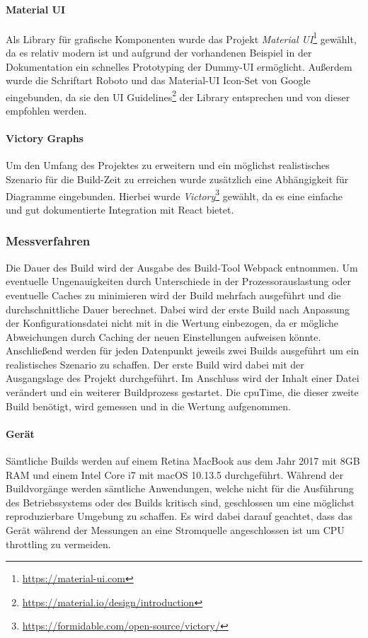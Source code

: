\documentclass[11pt]{article}
\begin{document}
				\paragraph{Material UI} Als Library für grafische Komponenten wurde das Projekt \emph{Material UI}\footnote{\url{https://material-ui.com}} gewählt, da es relativ modern ist und aufgrund der vorhandenen Beispiel in der Dokumentation ein schnelles Prototyping der Dummy-UI ermöglicht. Außerdem wurde die Schriftart Roboto und das Material-UI Icon-Set von Google eingebunden, da sie den UI Guidelines\footnote{\url{https://material.io/design/introduction}} der Library entsprechen und von dieser empfohlen werden.
				
				\paragraph{Victory Graphs} Um den Umfang des Projektes zu erweitern und ein möglichst realistisches Szenario für die Build-Zeit zu erreichen wurde zusätzlich eine Abhängigkeit für Diagramme eingebunden. Hierbei wurde \emph{Victory}\footnote{\url{https://formidable.com/open-source/victory/}} gewählt, da es eine einfache und gut dokumentierte Integration mit React bietet.
				
			\subsubsection{Messverfahren}
				Die Dauer des Build wird der Ausgabe des Build-Tool Webpack entnommen. Um eventuelle Ungenauigkeiten durch Unterschiede in der Prozessorauslastung oder eventuelle Caches zu minimieren wird der Build mehrfach ausgeführt und die durchschnittliche Dauer berechnet. Dabei wird der erste Build nach Anpassung der Konfigurationsdatei nicht mit in die Wertung einbezogen, da er mögliche Abweichungen durch Caching der neuen Einstellungen aufweisen könnte. Anschließend werden für jeden Datenpunkt jeweils zwei Builds ausgeführt um ein realistisches Szenario zu schaffen. Der erste Build wird dabei mit der Ausgangslage des Projekt durchgeführt. Im Anschluss wird der Inhalt einer Datei verändert und ein weiterer Buildprozess gestartet. Die \Gls{cpuTime}, die dieser zweite Build benötigt, wird gemessen und in die Wertung aufgenommen.
	            
				\paragraph{Gerät} Sämtliche Builds werden auf einem Retina MacBook aus dem Jahr 2017 mit 8GB RAM und einem Intel Core i7 mit macOS 10.13.5 durchgeführt. Während der Buildvorgänge werden sämtliche Anwendungen, welche nicht für die Ausführung des Betriebssystems oder des Builds kritisch sind, geschlossen um eine möglichst reproduzierbare Umgebung zu schaffen. Es wird dabei darauf geachtet, dass das Gerät während der Messungen an eine Stromquelle angeschlossen ist um CPU throttling zu vermeiden.
				
\end{document}
